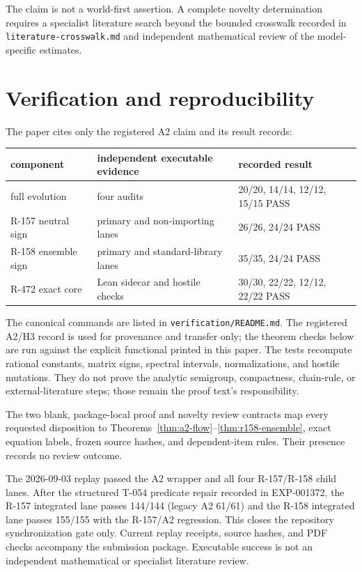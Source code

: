 \documentclass[11pt]{article}
\numberwithin{equation}{section}
\theoremstyle{definition}
\begin{document}
The claim is not a world-first assertion.  A complete novelty determination
requires a specialist literature search beyond the bounded crosswalk recorded
in \texttt{literature-crosswalk.md} and independent mathematical review of the
model-specific estimates.

\section{Verification and reproducibility}
\label{sec:verification}

The paper cites only the registered A2 claim and its result records:
\begin{center}
\small
\begin{tabular}{lll}
\toprule
component & independent executable evidence & recorded result\\
\midrule
full evolution & four audits & 20/20, 14/14, 12/12, 15/15 PASS\\
R-157 neutral sign & primary and non-importing lanes & 26/26, 24/24 PASS\\
R-158 ensemble sign & primary and standard-library lanes & 35/35, 24/24 PASS\\
R-472 exact core & Lean sidecar and hostile checks & 30/30, 22/22, 12/12, 22/22 PASS\\
\bottomrule
\end{tabular}
\end{center}

The canonical commands are listed in \texttt{verification/README.md}.  The
registered A2/H3 record is used for provenance and transfer only; the theorem
checks below are run against the explicit functional printed in this paper.
The tests recompute rational constants, matrix signs, spectral intervals,
normalizations, and hostile mutations.  They do not prove the analytic
semigroup, compactness, chain-rule, or external-literature steps; those remain
the proof text's responsibility.

The two blank, package-local proof and novelty review contracts map every
requested disposition to
Theorems~\ref{thm:a2-flow}--\ref{thm:r158-ensemble}, exact equation labels,
frozen source hashes, and dependent-item rules.  Their presence records no
review outcome.

The 2026-09-03 replay passed the A2 wrapper and all four R-157/R-158 child
lanes.  After the structured T-054 predicate repair recorded in EXP-001372,
the R-157 integrated lane passes 144/144 (legacy A2 61/61) and the R-158
integrated lane passes 155/155 with the R-157/A2 regression.  This closes the
repository synchronization gate only.  Current replay receipts, source hashes,
and PDF checks accompany the submission package.  Executable success is not
an independent mathematical or specialist literature review.
\end{document}
